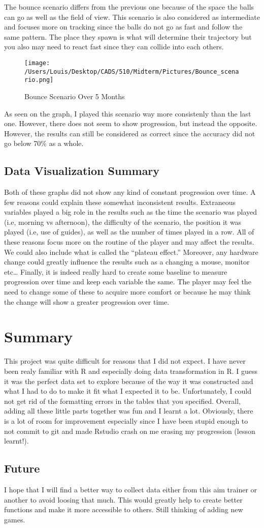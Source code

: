 \documentclass[
]{article}
\begin{document}
The bounce scenario differs from the previous one because of the space
the balls can go as well as the field of view. This scenario is also
considered as intermediate and focuses more on tracking since the balls
do not go as fast and follow the same pattern. The place they spawn is
what will determine their trajectory but you also may need to react fast
since they can collide into each others.

\begin{figure}
\centering
\texttt{[image: /Users/Louis/Desktop/CADS/510/Midterm/Pictures/Bounce\_scenario.png]}
\caption{Bounce Scenario Over 5 Months}
\end{figure}

As seen on the graph, I played this scenario way more consistenly than
the last one. However, there does not seem to show progression, but
instead the opposite. However, the results can still be considered as
correct since the accuracy did not go below 70\% as a whole.

\subsection*{Data Visualization Summary}

Both of these graphs did not show any kind of constant progression over
time. A few reasons could explain these somewhat inconsistent results.
Extraneous variables played a big role in the results such as the time
the scenario was played (i.e, morning vs afternoon), the difficulty of
the scenario, the position it was played (i.e, use of guides), as well
as the number of times played in a row. All of these reasons focus more
on the routine of the player and may affect the results. We could also
include what is called the ``plateau effect.'' Moreover, any hardware
change could greatly influence the results such as a changing a mouse,
monitor etc\ldots{} Finally, it is indeed really hard to create some
baseline to measure progression over time and keep each variable the
same. The player may feel the need to change some of these to acquire
more comfort or because he may think the change will show a greater
progression over time.

\section*{Summary}

This project was quite difficult for reasons that I did not expect. I
have never been realy familiar with R and especially doing data
transformation in R. I guess it was the perfect data set to explore
because of the way it was constructed and what I had to do to make it
fit what I expected it to be. Unfortunately, I could not get rid of the
formatting errors in the tables that you specified. Overall, adding all
these little parts together was fun and I learnt a lot. Obviously, there
is a lot of room for improvement especially since I have been stupid
enough to not commit to git and made Rstudio crash on me erasing my
progression (lesson learnt!).

\subsection*{Future}

I hope that I will find a better way to collect data either from this
aim trainer or another to avoid loosing that much. This would greatly
help to create better functions and make it more accessible to others.
Still thinking of adding new games.
\end{document}
